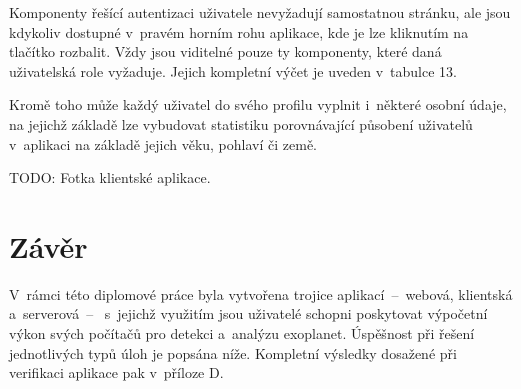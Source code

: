 \documentclass[a4paper,12pt]{article}
\begin{document}
{{{{{{{{{{{\vspace{-8pt}


Komponenty řešící autentizaci uživatele nevyžadují samostatnou stránku, ale jsou kdykoliv dostupné v~pravém horním rohu aplikace, kde je lze kliknutím na tlačítko rozbalit. Vždy jsou viditelné pouze ty komponenty, které daná uživatelská role vyžaduje. Jejich kompletní výčet je uveden v~tabulce 13.

Kromě toho může každý uživatel do svého profilu vyplnit i~některé osobní údaje, na jejichž základě lze vybudovat statistiku porovnávající působení uživatelů v~aplikaci na základě jejich věku, pohlaví či země.

\clearpage

{


TODO: Fotka klientské aplikace.


\clearpage\pagestyle{plain}
\section*{Závěr}

V~rámci této diplomové práce byla vytvořena trojice aplikací~--~webová, klientská a~serverová~--~ s~jejichž využitím jsou uživatelé schopni poskytovat výpočetní výkon svých počítačů pro detekci a~analýzu exoplanet. Úspěšnost při řešení jednotlivých typů úloh je popsána níže. Kompletní výsledky dosažené při verifikaci aplikace pak v~příloze D.

}}}}}}}}}}}}
\end{document}
